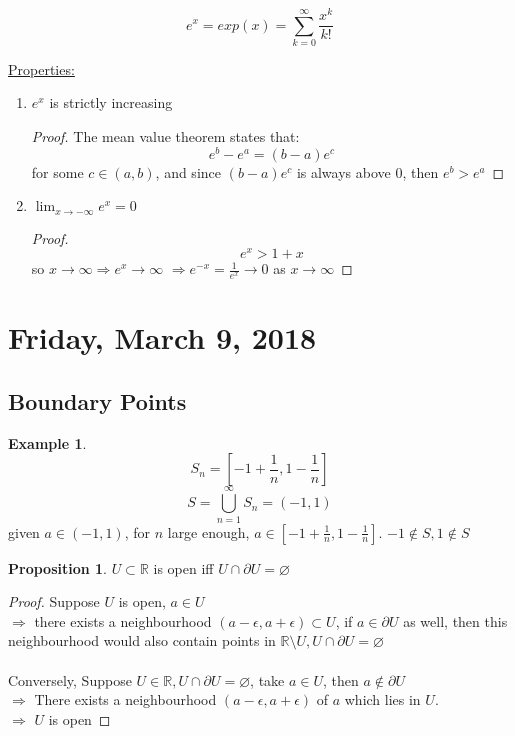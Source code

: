 \documentclass[12pt]{article}
\theoremstyle{plain}
\theoremstyle{definition}
\newtheorem{example}[theorem]{Example}
\newtheorem{proposition}[theorem]{Proposition}
\begin{document}
$$e^x = exp(x) = \sum^\infty_{k=0} \frac{x^k}{k!}$$

\underline{Properties:}
\begin{enumerate}
	\item{
	$e^x$ is strictly increasing
	\begin{proof}
		The mean value theorem states that:
		$$e^b - e^a = (b-a) e^c$$
		for some $c\in (a,b)$, and since $ (b-a) e^c$ is always above 0, then $e^b > e^a$
	\end{proof}

	}
	\item{$\lim_{x\to-\infty} e^x = 0$
	\begin{proof}
		$$e^x > 1+x$$
		so $x\to\infty \Longrightarrow e^x\to\infty$
		$\Longrightarrow e^{-x} = \frac{1}{e^x} \to 0$ as $x\to\infty$
	\end{proof}

	}
\end{enumerate}

\newpage

\section{Friday, March 9, 2018}

\subsection{Boundary Points}

\begin{example}
	$$S_n = [-1 + \frac{1}{n}, 1- \frac{1}{n}]$$
	$$S = \bigcup^\infty_{n=1} S_n = (-1,1)$$ given $a\in(-1,1)$, for $n$ large enough, $a\in [-1 + \frac{1}{n}, 1- \frac{1}{n}]$. $-1 \not\in S, 1 \not\in S$
\end{example}

\begin{proposition}
	$U \subset \mathbb{R}$ is open iff $U \cap \partial U = \varnothing$
\end{proposition}

\begin{proof}
	Suppose $U$ is open, $a \in U$\\
	$\Longrightarrow$ there exists a neighbourhood $(a-\epsilon, a+\epsilon) \subset U$, if $a\in \partial U$ as well, then this neighbourhood would also contain points in $\mathbb{R} \setminus U, U\cap \partial U = \varnothing $\\
	\\
	Conversely, Suppose $U \in \mathbb{R}, U\cap \partial U = \varnothing$, take $a \in U$, then $a \not\in \partial U$\\
	$\Longrightarrow$ There exists a neighbourhood $(a-\epsilon, a+\epsilon)$ of $a$ which lies in $U$.\\
	$\Longrightarrow$ $U$ is open
\end{proof}
\end{document}
